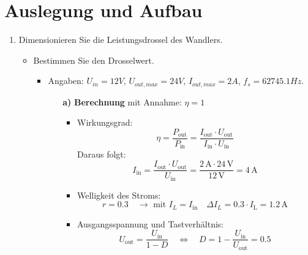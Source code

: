 \documentclass{article}
\begin{document}
\linespread{0.3}

\section{Auslegung und Aufbau}
\begin{enumerate}
    \item Dimensionieren Sie die Leistungsdrossel des Wandlers.
    \begin{itemize}
        \item Bestimmen Sie den Drosselwert.
        \begin{itemize}
            \item Angaben: $U_{in} = 12V$, $U_{out, max} = 24V$, $I_{out, max} = 2A$, $f_{s} = 62745.1Hz$.
            \begin{enumerate}
                \item[\textbf{a)}] \textbf{Berechnung} mit Annahme: $\eta = 1$
                \begin{itemize}
                    \item Wirkungsgrad:
                    \[
                    \eta = \frac{P_{\text{out}}}{P_{\text{in}}} = \frac{I_{\text{out}} \cdot U_{\text{out}}}{I_{\text{in}} \cdot U_{\text{in}}}
                    \]
                    Daraus folgt:
                    \[
                    I_{\text{in}} = \frac{I_{\text{out}} \cdot U_{\text{out}}}{U_{\text{in}}} = \frac{2\,\text{A} \cdot 24\,\text{V}}{12\,\text{V}} = 4\,\text{A}
                    \]
            
                    \item Welligkeit des Stroms:
                    \[
                    r = 0.3 \quad \rightarrow \text{ mit } I_L = I_{\text{in}} \quad \Delta I_L = 0.3 \cdot I_{\text{L}} = 1.2\,\text{A}
                    \]
            
                    \item Ausgangsspannung und Tastverhältnis:
                    \[
                    U_{\text{out}} = \frac{U_{\text{in}}}{1 - D} \quad \Leftrightarrow \quad D = 1 - \frac{U_{\text{in}}}{U_{\text{out}}} = 0.5
                    \]
            

\end{itemize}
\end{enumerate}
\end{itemize}
\end{itemize}
\end{enumerate}
\end{document}
